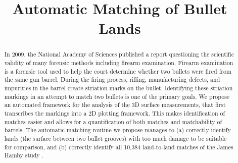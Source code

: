 \documentclass[aoas, preprint]{imsart}\usepackage[]{graphicx}\usepackage[]{color}
\begin{document}
\begin{frontmatter}

\title{Automatic Matching of Bullet Lands}

%
\begin{abstract}
In 2009, the National Academy of Sciences published a report questioning the scientific validity of many forensic methods including firearm examination. Firearm examination is a forensic tool used to help the court determine whether two bullets were fired from the same gun barrel. During the firing process, rifling, manufacturing defects, and impurities in the barrel create striation marks on the bullet. Identifying these striation markings in an attempt to match two bullets is one of the primary goals. We propose an automated framework for the analysis of the 3D surface measurements, that first transcribes the markings into a 2D plotting framework. This makes identification of matches easier and allows for a quantification of both matches and matchability of barrels. The automatic matching routine we propose manages to (a) correctly identify lands (the surface between two bullet grooves) with too much damage to be suitable for comparison, and (b) correctly identify all 10,384 land-to-land matches of the James Hamby study \citep{hamby:2009}.
\end{abstract}


\end{frontmatter}
\end{document}
